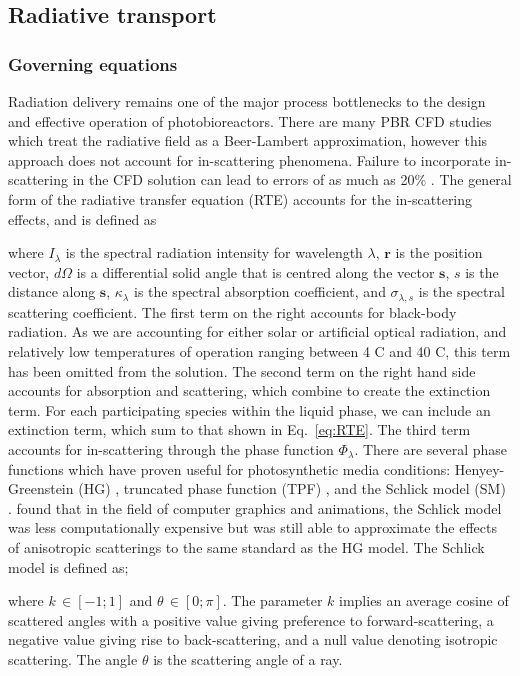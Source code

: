 \subsection{Radiative transport}
\subsubsection{Governing equations}
Radiation delivery remains one of the major process bottlenecks to the design and effective operation of photobioreactors. There are many PBR CFD studies which treat the radiative field as a Beer-Lambert approximation, however this approach does not account for in-scattering phenomena. Failure to incorporate in-scattering in the CFD solution can lead to errors of as much as 20\% \cite{berberoglu2007}. The general form of the radiative transfer equation (RTE) accounts for the in-scattering effects, and is defined as



\noindent where $I_\lambda$ is the spectral radiation intensity for wavelength $\lambda$, $\mathbf{r}$ is the position vector, $d\Omega$ is a differential solid angle that is centred along the vector $\mathbf{s}$, $s$ is the distance along $\mathbf{s}$, $\kappa_\lambda$ is the spectral absorption coefficient, and $\sigma_{\lambda,s}$ is the spectral scattering coefficient. The first term on the right accounts for black-body radiation. As we are accounting for either solar or artificial optical radiation, and relatively low temperatures of operation ranging between 4 \degree C and 40 \degree C, this term has been omitted from the solution. The second term on the right hand side accounts for absorption and scattering,  which combine to create the extinction term. For each participating species within the liquid phase, we can include an extinction term, which sum to that shown in Eq.\ \ref{eq:RTE}. The third term accounts for in-scattering through the phase function $\Phi_\lambda$. 
\skippingparagraph
There are several phase functions which have proven useful for photosynthetic media conditions: Henyey-Greenstein (HG) \cite{kong2014}, truncated phase function (TPF) \cite{berberoglu2007}, and the Schlick model (SM) \cite{jarosz2008}. \cite{jarosz2008} found that in the field of computer graphics and animations, the Schlick model was less computationally expensive but was still able to approximate the effects of anisotropic scatterings to the same standard as the HG model. The Schlick model is defined as;


%
where $k \, \in [-1;1]$ and $\theta \, \in [0;\pi]$. The parameter $k$ implies an average cosine of scattered angles with a positive value giving preference to forward-scattering, a negative value giving rise to back-scattering, and a null value denoting isotropic scattering. The angle $\theta$ is the scattering angle of a ray.
\skippingparagraph

